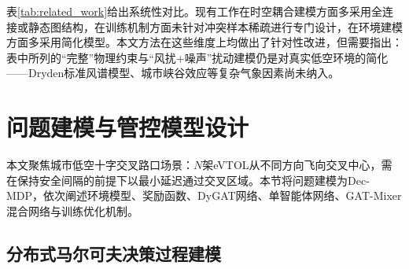 \documentclass[12pt,a4paper,UTF8]{ctexart}
\begin{document}
表\ref{tab:related_work}给出系统性对比。现有工作在时空耦合建模方面多采用全连接或静态图结构，在训练机制方面未针对冲突样本稀疏进行专门设计，在环境建模方面多采用简化模型。本文方法在这些维度上均做出了针对性改进，但需要指出：表中所列的``完整''物理约束与``风扰+噪声''扰动建模仍是对真实低空环境的简化——Dryden标准风谱模型、城市峡谷效应等复杂气象因素尚未纳入。

\begin{table}[H]
    \centering
    \caption{本文方法与代表性相关工作的系统性对比}
    \label{tab:related_work}
\end{table}

\section{问题建模与管控模型设计}

本文聚焦城市低空十字交叉路口场景：$N$架eVTOL从不同方向飞向交叉中心，需在保持安全间隔的前提下以最小延迟通过交叉区域。本节将问题建模为Dec-MDP，依次阐述环境模型、奖励函数、DyGAT网络、单智能体网络、GAT-Mixer混合网络与训练优化机制。

\subsection{分布式马尔可夫决策过程建模}
\end{document}
